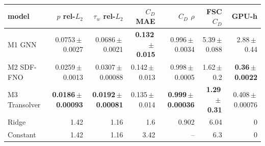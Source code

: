 \caption{In-distribution accuracy, consistency and cost (AirfRANS \texttt{full}). $C_D$ MAE and FSC $C_D$ in units of $10^{-3}$. Neural rows are seed mean $\pm$ std over the 3--5 committed seeds; baselines are deterministic single fits. Bold marks the best neural model per column. The symmetry residual is Figure~\ref{fig:symmetry}.}
\label{tab:indist}
\providecommand{\tblfont}{\footnotesize}%
\tblfont
\setlength{\tabcolsep}{4pt}
\begin{tabular}{lrrrrrr}
\toprule
model & $p$ rel-$L_2$ & $\tau_w$ rel-$L_2$ & $C_D$ MAE & $C_D$ $\rho$ & FSC $C_D$ & GPU-h \\
\midrule
M1 GNN & 0.0753\,$\pm$\,0.0027 & 0.0686\,$\pm$\,0.0021 & \textbf{0.132\,$\pm$\,0.015} & 0.996\,$\pm$\,0.0034 & 5.39\,$\pm$\,0.088 & 2.88\,$\pm$\,0.44 \\
M2 SDF-FNO & 0.0259\,$\pm$\,0.0013 & 0.0307\,$\pm$\,0.00088 & 0.142\,$\pm$\,0.013 & 0.998\,$\pm$\,0.0005 & 1.62\,$\pm$\,0.2 & \textbf{0.36\,$\pm$\,0.0022} \\
M3 Transolver & \textbf{0.0186\,$\pm$\,0.00093} & \textbf{0.0192\,$\pm$\,0.00081} & 0.135\,$\pm$\,0.014 & \textbf{0.999\,$\pm$\,0.00036} & \textbf{1.29\,$\pm$\,0.31} & 0.408\,$\pm$\,0.00076 \\
Ridge & 1.42 & 1.16 & 1.6 & 0.902 & 6.04 & 0 \\
Constant & 1.42 & 1.16 & 3.42 & -- & 6.3 & 0 \\
\bottomrule
\end{tabular}
